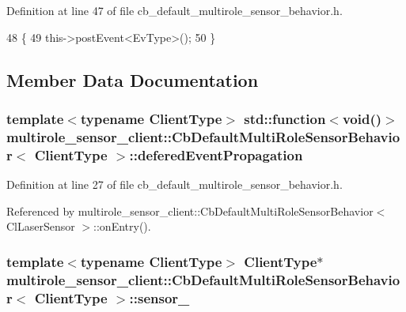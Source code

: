 Definition at line 47 of file cb\+\_\+default\+\_\+multirole\+\_\+sensor\+\_\+behavior.\+h.


\begin{DoxyCode}
48   \{
49     this->postEvent<EvType>();
50   \}
\end{DoxyCode}


\subsection{Member Data Documentation}
\subsubsection[{\texorpdfstring{defered\+Event\+Propagation}{deferedEventPropagation}}]{\setlength{\rightskip}{0pt plus 5cm}template$<$typename Client\+Type$>$ std\+::function$<$void()$>$ {\bf multirole\+\_\+sensor\+\_\+client\+::\+Cb\+Default\+Multi\+Role\+Sensor\+Behavior}$<$ Client\+Type $>$\+::defered\+Event\+Propagation}\hypertarget{classmultirole__sensor__client_1_1CbDefaultMultiRoleSensorBehavior_af49bfde7f78897b0e884faae69077013}{}\label{classmultirole__sensor__client_1_1CbDefaultMultiRoleSensorBehavior_af49bfde7f78897b0e884faae69077013}


Definition at line 27 of file cb\+\_\+default\+\_\+multirole\+\_\+sensor\+\_\+behavior.\+h.



Referenced by multirole\+\_\+sensor\+\_\+client\+::\+Cb\+Default\+Multi\+Role\+Sensor\+Behavior$<$ Cl\+Laser\+Sensor $>$\+::on\+Entry().

\subsubsection[{\texorpdfstring{sensor\+\_\+}{sensor_}}]{\setlength{\rightskip}{0pt plus 5cm}template$<$typename Client\+Type$>$ Client\+Type$\ast$ {\bf multirole\+\_\+sensor\+\_\+client\+::\+Cb\+Default\+Multi\+Role\+Sensor\+Behavior}$<$ Client\+Type $>$\+::sensor\+\_\+}\hypertarget{classmultirole__sensor__client_1_1CbDefaultMultiRoleSensorBehavior_a5e4e65ada73da49c2b8579b422b97d0d}{}\label{classmultirole__sensor__client_1_1CbDefaultMultiRoleSensorBehavior_a5e4e65ada73da49c2b8579b422b97d0d}



